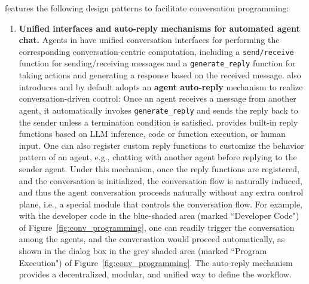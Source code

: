 \libName features the following design patterns to facilitate conversation programming:
\begin{enumerate}[leftmargin=*]
    \vspace{-1mm}
    \setlength\itemsep{-0.1em}
    \item \textbf{Unified interfaces and auto-reply mechanisms for automated agent chat.}  
   Agents in \libName have unified conversation interfaces for performing the corresponding conversation-centric computation, including a \texttt{send/receive} function for sending/receiving messages and a \texttt{generate\_reply} function for taking actions and generating a response based on the received message.    
\libName also introduces and by default adopts an \textbf{agent auto-reply} mechanism to realize conversation-driven control:
Once an agent receives a message from another agent, it automatically invokes \texttt{generate\_reply} and sends the reply back to the sender unless a termination condition is satisfied. 
\libName provides built-in reply functions based on LLM inference, code or function execution, or human input. One can also register custom reply functions to customize the behavior pattern of an agent, e.g., chatting with another agent before replying to the sender agent. Under this mechanism, once the reply functions are registered, and the conversation is initialized, the conversation flow is naturally induced, and thus the agent conversation proceeds naturally without any extra control plane, i.e., a special module that controls the conversation flow. 
For example, with the developer code in the blue-shaded area (marked ``Developer Code") of Figure~\ref{fig:conv_programming}, one can readily trigger the conversation among the agents, and the conversation would proceed automatically, as shown in the dialog box in the grey shaded area (marked ``Program Execution") of Figure~\ref{fig:conv_programming}. 
The auto-reply mechanism provides a decentralized, modular, and unified way to define the workflow.


\end{enumerate}
